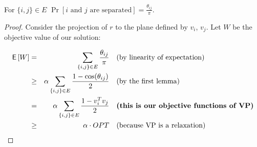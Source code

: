 \begin{lemma}
	For $\{i,j\} \in E$ $\Pr [i \text{ and } j \text{ are separated}] = \frac{\theta_{ij}}{\pi}$.
\end{lemma}

\begin{proof}
	Consider the projection of $r$ to the plane defined by $v_i$, $v_j$. Let $W$ be the objective value of our solution:
	
	$$
	\begin{aligned}
		\operatorname{\textsf{E}\,} [W] & =    & \sum_{\{i,j\} \in E} \frac{\theta_{ij}}{\pi} & \quad \text{(by linearity of expectation)} \\
		       & \geq & \alpha \sum_{\{i,j\} \in E} \frac{1 - \cos (\theta_{ij})}{2} & \quad \text{(by the first lemma)} \\
		       & =    & \alpha \sum_{\{i,j\} \in E} \frac{1 - v_{i}^T v_{j}}{2} & \quad \textbf{(this is our objective functions of VP)} \\
		       & \geq & \alpha \cdot OPT & \quad \text{(because VP is a relaxation)}
	\end{aligned}
	$$
\end{proof}
